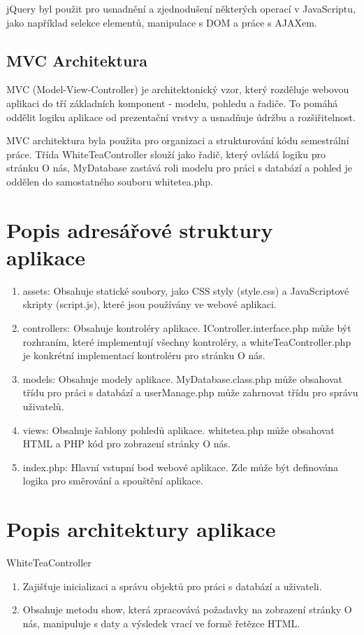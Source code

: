 \documentclass[12pt, a4paper]{report}
\begin{document}
jQuery byl použit pro usnadnění a zjednodušení některých operací v JavaScriptu, jako například selekce elementů, manipulace s DOM a práce s AJAXem.

\subsection{MVC Architektura}
MVC (Model-View-Controller) je architektonický vzor, který rozděluje webovou aplikaci do tří základních komponent - modelu, pohledu a řadiče. To pomáhá oddělit logiku aplikace od prezentační vrstvy a usnadňuje údržbu a rozšiřitelnost.

MVC architektura byla použita pro organizaci a strukturování kódu semestrální práce. Třída WhiteTeaController slouží jako řadič, který ovládá logiku pro stránku O nás, MyDatabase zastává roli modelu pro práci s databází a pohled je oddělen do samostatného souboru whitetea.php.





\section{Popis adresářové struktury aplikace}

\begin{enumerate}[left=1cm]
\item assets: Obsahuje statické soubory, jako CSS styly (style.css) a JavaScriptové skripty (script.js), které jsou používány ve webové aplikaci.
\item controllers: Obsahuje kontroléry aplikace. IController.interface.php může být rozhraním, které implementují všechny kontroléry, a whiteTeaController.php je konkrétní implementací kontroléru pro stránku O nás.
\item models: Obsahuje modely aplikace. MyDatabase.class.php může obsahovat třídu pro práci s databází a userManage.php může zahrnovat třídu pro správu uživatelů.
\item views: Obsahuje šablony pohledů aplikace. whitetea.php může obsahovat HTML a PHP kód pro zobrazení stránky O nás.
\item index.php: Hlavní vstupní bod webové aplikace. Zde může být definována logika pro směrování a spouštění aplikace.

\end{enumerate} 

\section{Popis architektury aplikace}
WhiteTeaController
\begin{enumerate}[left=1cm]
    \item Zajišťuje inicializaci a správu objektů pro práci s databází a uživateli.
    \item Obsahuje metodu show, která zpracovává požadavky na zobrazení stránky O nás, manipuluje s daty a výsledek vrací ve formě řetězce HTML.
\end{enumerate} 
\end{document}

